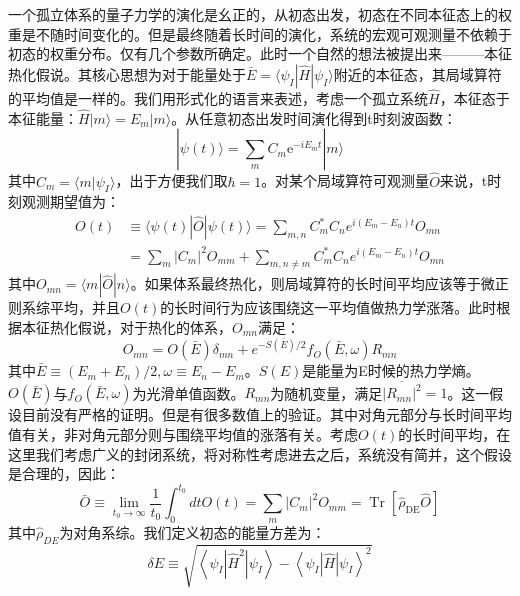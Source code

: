 一个孤立体系的量子力学的演化是幺正的，从初态出发，初态在不同本征态上的权重是不随时间变化的。但是最终随着长时间的演化，系统的宏观可观测量不依赖于初态的权重分布。仅有几个参数所确定。此时一个自然的想法被提出来———本征热化假说\cite{Deutsch1991quantum,Srednicki1994chaos,srednicki1999approach}。其核心思想为对于能量处于$\bar{E}=\langle\psi_I|\hat{H}|\psi_I\rangle$附近的本征态，其局域算符的平均值是一样的。我们用形式化的语言来表述，考虑一个孤立系统$\hat{H}$，本征态于本征能量：$\hat{H}|m\rangle=E_m|m\rangle$。从任意初态出发时间演化得到t时刻波函数：
\begin{equation}
|\psi(t)\rangle=\sum_{m} C_{m} \mathrm{e}^{-i E_{m} t}|m\rangle
\end{equation}
其中$C_m = \langle m | \psi_I\rangle$，出于方便我们取$\hbar=1$。对某个局域算符可观测量$\hat{O}$来说，t时刻观测期望值为：
\begin{equation}
\begin{aligned}
O(t) & \equiv\langle\psi(t)|\hat{O}| \psi(t)\rangle=\sum_{m, n} C_{m}^{*} C_{n} e^{i\left(E_{m}-E_{n}\right) t} O_{m n} \\
&=\sum_{m}\left|C_{m}\right|^{2} O_{m m}+\sum_{m, n \neq m} C_{m}^{*} C_{n} e^{i\left(E_{m}-E_{n}\right) t} O_{m n}
\end{aligned}
\end{equation}
其中$O_{m n}=\langle m|\hat{O}| n\rangle$。如果体系最终热化，则局域算符的长时间平均应该等于微正则系综平均，并且$O(t)$的长时间行为应该围绕这一平均值做热力学涨落。此时根据本征热化假说，对于热化的体系，$O_{mn}$满足：
\begin{equation}
O_{m n}=O(\bar{E}) \delta_{m n}+e^{-S(\bar{E}) / 2} f_{O}(\bar{E}, \omega) R_{m n}
\end{equation}
其中$\bar{E} \equiv\left(E_{m}+E_{n}\right) / 2, \omega \equiv E_{n}-E_{m}$。$S(E)$是能量为E时候的热力学熵。$O(\bar{E})$与$f_{O}(\bar{E}, \omega)$为光滑单值函数。$R_{m n}$为随机变量，满足$\overline{\left|R_{m n}\right|^{2}}=1$。这一假设目前没有严格的证明。但是有很多数值上的验证。其中对角元部分与长时间平均值有关，非对角元部分则与围绕平均值的涨落有关。考虑$O(t)$的长时间平均，在这里我们考虑广义的封闭系统，将对称性考虑进去之后，系统没有简并，这个假设是合理的，因此：
\begin{equation}
\bar{O} \equiv \lim _{t_{0} \rightarrow \infty} \frac{1}{t_{0}} \int_{0}^{t_{0}} d t O(t)=\sum_{m}\left|C_{m}\right|^{2} O_{m m}=\operatorname{Tr}\left[\hat{\rho}_{\mathrm{DE}} \hat{O}\right]
\end{equation}
其中$\hat{\rho}_{DE}$为对角系综。我们定义初态的能量方差为：
\begin{equation}
\delta E \equiv \sqrt{\left\langle\psi_{I}\left|\hat{H}^{2}\right| \psi_{I}\right\rangle-\left\langle\psi_{I}|\hat{H}| \psi_{I}\right\rangle^{2}}
\end{equation}
